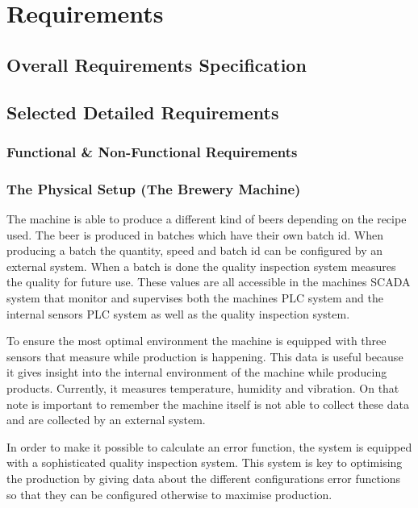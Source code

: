 \section{Requirements}

\subsection{Overall Requirements Specification}

\subsection{Selected Detailed Requirements}

\subsubsection{Functional \& Non-Functional Requirements}

\subsubsection{The Physical Setup (The Brewery Machine)}

The machine is able to produce a different kind of beers depending on the recipe
used. The beer is produced in batches which have their own batch id. When 
producing a batch the quantity, speed and batch id can be configured by an 
external system. When a batch is done the quality inspection system measures 
the quality for future use. These values are all accessible in the machines 
SCADA system that monitor and supervises both the machines PLC system and the 
internal sensors PLC system as well as the quality inspection system.

To ensure the most optimal environment the machine is equipped with three 
sensors that measure while production is happening. This data is useful because 
it gives insight into the internal environment of the machine while producing 
products. Currently, it measures temperature, humidity and vibration. On that 
note is important to remember the machine itself is not able to collect these 
data and are collected by an external system.

In order to make it possible to calculate an error function, the system is 
equipped with a sophisticated quality inspection system. This system is key to 
optimising the production by giving data about the different configurations 
error functions so that they can be configured otherwise to maximise production.


